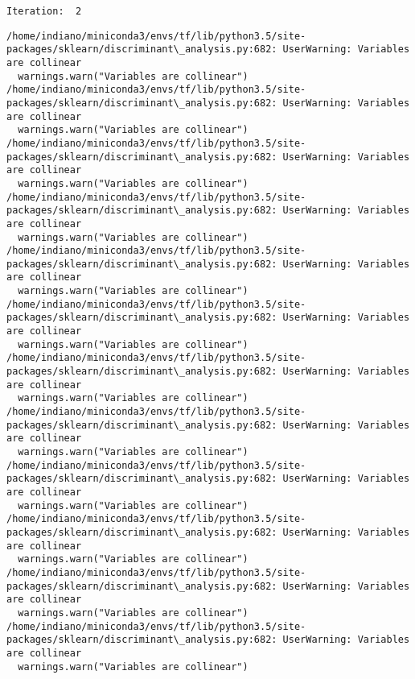 \documentclass[11pt]{article}
\begin{document}
    \begin{Verbatim}[commandchars=\\\{\}]
Iteration:  2

    \end{Verbatim}

    \begin{Verbatim}[commandchars=\\\{\}]
/home/indiano/miniconda3/envs/tf/lib/python3.5/site-packages/sklearn/discriminant\_analysis.py:682: UserWarning: Variables are collinear
  warnings.warn("Variables are collinear")
/home/indiano/miniconda3/envs/tf/lib/python3.5/site-packages/sklearn/discriminant\_analysis.py:682: UserWarning: Variables are collinear
  warnings.warn("Variables are collinear")
/home/indiano/miniconda3/envs/tf/lib/python3.5/site-packages/sklearn/discriminant\_analysis.py:682: UserWarning: Variables are collinear
  warnings.warn("Variables are collinear")
/home/indiano/miniconda3/envs/tf/lib/python3.5/site-packages/sklearn/discriminant\_analysis.py:682: UserWarning: Variables are collinear
  warnings.warn("Variables are collinear")
/home/indiano/miniconda3/envs/tf/lib/python3.5/site-packages/sklearn/discriminant\_analysis.py:682: UserWarning: Variables are collinear
  warnings.warn("Variables are collinear")
/home/indiano/miniconda3/envs/tf/lib/python3.5/site-packages/sklearn/discriminant\_analysis.py:682: UserWarning: Variables are collinear
  warnings.warn("Variables are collinear")
/home/indiano/miniconda3/envs/tf/lib/python3.5/site-packages/sklearn/discriminant\_analysis.py:682: UserWarning: Variables are collinear
  warnings.warn("Variables are collinear")
/home/indiano/miniconda3/envs/tf/lib/python3.5/site-packages/sklearn/discriminant\_analysis.py:682: UserWarning: Variables are collinear
  warnings.warn("Variables are collinear")
/home/indiano/miniconda3/envs/tf/lib/python3.5/site-packages/sklearn/discriminant\_analysis.py:682: UserWarning: Variables are collinear
  warnings.warn("Variables are collinear")
/home/indiano/miniconda3/envs/tf/lib/python3.5/site-packages/sklearn/discriminant\_analysis.py:682: UserWarning: Variables are collinear
  warnings.warn("Variables are collinear")
/home/indiano/miniconda3/envs/tf/lib/python3.5/site-packages/sklearn/discriminant\_analysis.py:682: UserWarning: Variables are collinear
  warnings.warn("Variables are collinear")
/home/indiano/miniconda3/envs/tf/lib/python3.5/site-packages/sklearn/discriminant\_analysis.py:682: UserWarning: Variables are collinear
  warnings.warn("Variables are collinear")

    \end{Verbatim}
\end{document}
